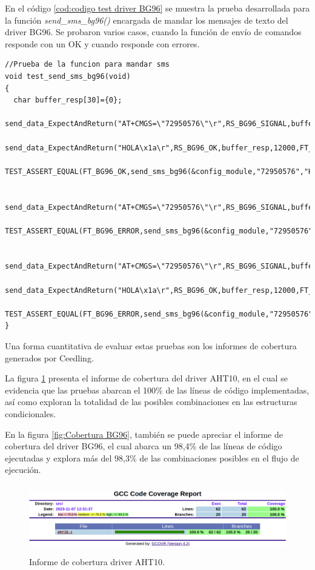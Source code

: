 En el código \ref{cod:codigo test driver BG96} se muestra la prueba desarrollada para la función \emph{send\_sms\_bg96()} encargada de mandar los mensajes de texto del driver BG96. Se probaron varios casos, cuando la función de envío de comandos responde con un OK y cuando responde con errores.
\begin{lstlisting}[label=cod:codigo test driver BG96,caption=Tests del driver del módulo BG96.] 
//Prueba de la funcion para mandar sms  
void test_send_sms_bg96(void)
{
  char buffer_resp[30]={0};
  send_data_ExpectAndReturn("AT+CMGS=\"72950576\"\r",RS_BG96_SIGNAL,buffer_resp,12000,FT_BG96_OK);
  send_data_ExpectAndReturn("HOLA\x1a\r",RS_BG96_OK,buffer_resp,12000,FT_BG96_OK);
  TEST_ASSERT_EQUAL(FT_BG96_OK,send_sms_bg96(&config_module,"72950576","HOLA"));

  send_data_ExpectAndReturn("AT+CMGS=\"72950576\"\r",RS_BG96_SIGNAL,buffer_resp,12000,FT_BG96_ERROR);
  TEST_ASSERT_EQUAL(FT_BG96_ERROR,send_sms_bg96(&config_module,"72950576","HOLA"));

  send_data_ExpectAndReturn("AT+CMGS=\"72950576\"\r",RS_BG96_SIGNAL,buffer_resp,12000,FT_BG96_OK);
  send_data_ExpectAndReturn("HOLA\x1a\r",RS_BG96_OK,buffer_resp,12000,FT_BG96_ERROR);
  TEST_ASSERT_EQUAL(FT_BG96_ERROR,send_sms_bg96(&config_module,"72950576","HOLA"));
}
\end{lstlisting}

Una forma cuantitativa de evaluar estas pruebas son los informes de cobertura generados por Ceedling.

La figura \ref{fig:Cobertura aht10} presenta el informe de cobertura del driver AHT10, en el cual se evidencia que las pruebas abarcan el 100\% de las líneas de código implementadas, así como exploran la totalidad de las posibles combinaciones en las estructuras condicionales.

En la figura \ref{fig:Cobertura BG96}, también se puede apreciar el informe de cobertura del driver BG96, el cual abarca un 98,4\% de las líneas de código ejecutadas y explora más del 98,3\% de las combinaciones posibles en el flujo de ejecución.

\begin{figure}[h!]
    \centering
      \includegraphics[width=\linewidth, height=3cm]{./Figures/cobertura_aht10_2.png}
    \caption{Informe de cobertura driver AHT10.}
      \label{fig:Cobertura aht10}
  \end{figure}

